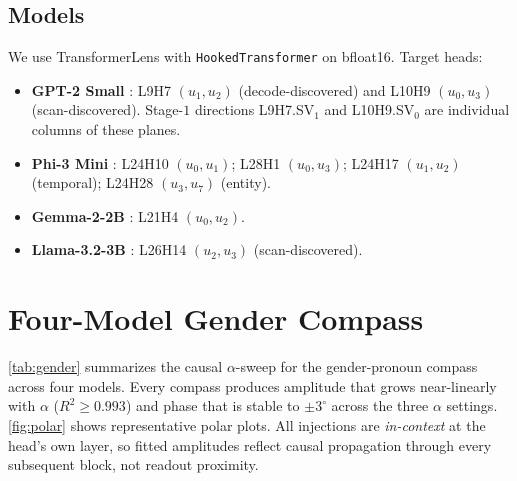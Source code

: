 \subsection{Models}

We use TransformerLens \citep{nanda2022transformerlens} with
\texttt{HookedTransformer} on bfloat16. Target heads:

\begin{itemize}
    \item \textbf{GPT-2 Small}
      \citep{radford2019language}: L9H7 $(u_1, u_2)$
      (decode-discovered) and L10H9 $(u_0, u_3)$
      (scan-discovered). Stage-$1$ directions L9H7.SV$_1$ and
      L10H9.SV$_0$ are individual columns of these planes.
    \item \textbf{Phi-3 Mini} \citep{abdin2024phi3}: L24H10
      $(u_0, u_1)$; L28H1 $(u_0, u_3)$; L24H17 $(u_1, u_2)$
      (temporal); L24H28 $(u_3, u_7)$ (entity).
    \item \textbf{Gemma-2-2B} \citep{team2024gemma}: L21H4
      $(u_0, u_2)$.
    \item \textbf{Llama-3.2-3B} \citep{grattafiori2024llama3}:
      L26H14 $(u_2, u_3)$ (scan-discovered).
\end{itemize}

\section{Four-Model Gender Compass}
\label{sec:gender}

\cref{tab:gender} summarizes the causal $\alpha$-sweep for the
gender-pronoun compass across four models. Every compass produces
amplitude that grows near-linearly with $\alpha$
($R^2 \ge 0.993$) and phase that is stable to $\pm 3^\circ$
across the three $\alpha$ settings. \cref{fig:polar} shows
representative polar plots. All injections are \emph{in-context}
at the head's own layer, so fitted amplitudes reflect causal
propagation through every subsequent block, not readout
proximity.

